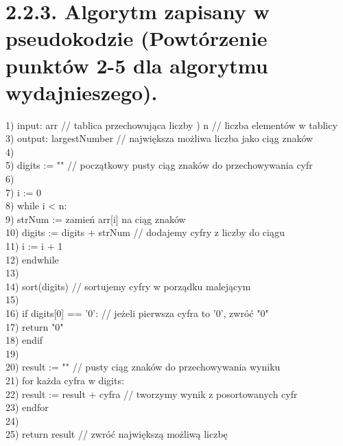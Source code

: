 \documentclass[a4paper,12pt]{article}
\begin{document}
	\section{2.2.3. Algorytm zapisany w pseudokodzie (Powtórzenie punktów 2-5 dla algorytmu wydajnieszego).}
	1) input: arr // tablica przechowująca liczby
	) n // liczba elementów w tablicy \\
	3) output: largestNumber // największa możliwa liczba jako ciąg znaków \\
	4) \\
	5) digits := "" // początkowy pusty ciąg znaków do przechowywania cyfr \\
	6) \\
	7) i := 0 \\
	8) while i < n: \\
	9)\hspace{1cm} strNum := zamień arr[i] na ciąg znaków \\
	10) \hspace{1cm}digits := digits + strNum // dodajemy cyfry z liczby do ciągu \\
	11) \hspace{1cm} i := i + 1 \\
	12) endwhile \\
	13) \\
	14) sort(digits) // sortujemy cyfry w porządku malejącym \\
	15) \\
	16) if digits[0] == '0': // jeżeli pierwsza cyfra to '0', zwróć "0" \\
	17) \hspace{1cm}return "0" \\
	18) endif \\
	19) \\
	20) result := "" // pusty ciąg znaków do przechowywania wyniku \\
	21) for każda cyfra w digits: \\
	22) \hspace{1cm} result := result + cyfra // tworzymy wynik z posortowanych  cyfr \\
	23) endfor \\
	24) \\
	25) return result // zwróć największą możliwą liczbę 
\end{document}

